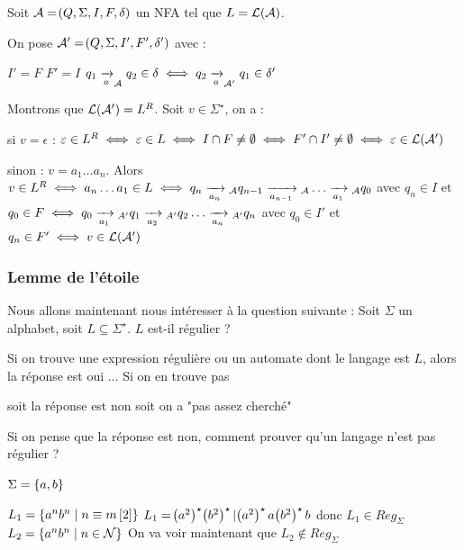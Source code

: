 \documentclass[a4paper,french,bookmarks]{book}
\begin{document}
    \begin{nproof}
        Soit $\mathcal{A} = \!\left(Q, \Sigma, I, F, \delta\right)$ un NFA tel que $L = \mathcal{L}\!\left(\mathcal{A}\right)$.
        
        On pose $\mathcal{A}' = \!\left(Q, \Sigma, I', F', \delta'\right)$ avec :
        \begin{enumerate}
            \itt $I' = F$
            \itt $F' = I$
            \itt $q_1 \lima{a}_\bcA q_2 \in \delta \iff q_2 \lima{a}_{\bcA'} q_1 \in \delta'$
        \end{enumerate}
        Montrons que $\mathcal{L}\!\left(\mathcal{A}'\right) = L^R$. Soit $v \in \Sigma^\star$, on a :
        \begin{enumerate}
            \itt si $v = \epsilon$ : $\varepsilon \in L^R \iff \varepsilon \in L \iff I \cap F \neq \emptyset \iff F' \cap I' \neq \emptyset \iff \varepsilon \in \mathcal{L}\!\left(\mathcal{A}'\right)$
            
            \itt sinon : $v = a_1 \dots a_n$.
            Alors $v \in L^R \iff a_n \dots a_1 \in L \iff q_n \lima{a_{n}}{}_\bcA q_{n-1} \lima{a_{n-1}}{}_\bcA \dots \lima{a_1}{}_\bcA q_0$ avec $q_n \in I$ et $q_0 \in F \iff q_0 \lima{a_1}{}_{A'} q_1 \lima{a_2}{}_{A'} q_2 \dots \lima{a_n}{}_{A'} q_n$ avec $q_0 \in I'$ et $q_n \in F' \iff v \in \mathcal{L}\!\left(\mathcal{A}'\right)$
        \end{enumerate}
    \end{nproof}
    
    \subsubsection{Lemme de l'étoile}
    
    Nous allons maintenant nous intéresser à la question suivante :
    Soit $\Sigma$ un alphabet, soit $L \subseteq \Sigma^\star$. $L$ est-il régulier ?
    \begin{enumerate}
        \itt Si on trouve une expression régulière ou un automate dont le langage est $L$, alors la réponse est oui $\dots$
        \itt Si on en trouve pas
        \begin{enumerate}
            \itt soit la réponse est non
            \itt soit on a "pas assez cherché"
        \end{enumerate}
    \end{enumerate}
    Si on pense que la réponse est non, comment prouver qu'un langage n'est pas régulier ?
    
    \begin{example}{}{}
        $\Sigma = \left\{a, b\right\}$
        \begin{enumerate}
            \itt $L_1 = \left\{a^n b^n\;\middle\vert\; n \equiv m \left[2\right]\right\}$
            $L_1 = \!\left(a^2\right)^\star \!\left(b^2\right)^\star \vert \!\left(a^2\right)^\star a \!\left(b^2\right)^\star b$
            donc $L_1 \in Reg_\Sigma$
            \itt $L_2 = \left\{a^n b^n \;\middle\vert\; n \in \mathcal{N}\right\}$
            On va voir maintenant que $L_2 \notin Reg_\Sigma$
        \end{enumerate}
    \end{example}
    
\end{document}
